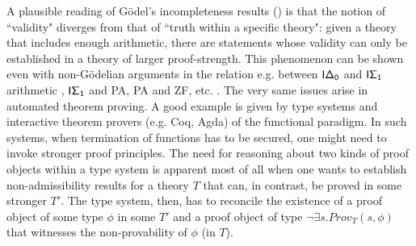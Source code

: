 \documentclass[11pt]{eptcs} %
\begin{document}
A plausible reading of  G\"{o}del's incompleteness results (\cite{citeulike:713002})  is that the notion of ``validity" diverges from that of ``truth within a specific theory": given a theory that includes enough arithmetic, there are statements whose validity can only be established in a theory of larger proof-strength.  This phenomenon can be shown even with non-G\"{o}delian arguments in the relation e.g.  between ${\sf I\Delta_0}$ and ${\sf I\Sigma_1}$ arithmetic \cite{parikh:existence},
${\sf I\Sigma_1}$ and {\sf PA}, {\sf PA} and {\sf ZF},  etc. \cite{Smith05anintroduction, Buss199879}. The very same issues arise in automated theorem proving. A good example is given by type systems and interactive theorem provers (e.g. Coq, Agda) of the functional paradigm. In such systems, when termination of functions has to be secured, one might need to invoke stronger proof principles. 
The need for reasoning about two kinds of proof objects within a type system is apparent most of all when one wants to establish non-admissibility  results for a theory $T$ that can, in contrast, be proved in some stronger $T'$. The type system, then, has to reconcile the existence of  a proof object of some type $\phi$ in some $T'$  and a proof object of type $\neg \exists s. Prov_{T}(s,\phi)$ that witnesses the non-provability of  $\phi$ (in $T$). 
\end{document}
